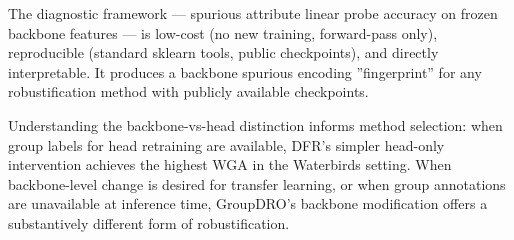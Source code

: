 The diagnostic framework --- spurious attribute linear probe accuracy on frozen backbone features --- is low-cost (no new training, forward-pass only), reproducible (standard sklearn tools, public checkpoints), and directly interpretable. It produces a backbone spurious encoding ''fingerprint'' for any robustification method with publicly available checkpoints.

Understanding the backbone-vs-head distinction informs method selection: when group labels for head retraining are available, DFR's simpler head-only intervention achieves the highest WGA in the Waterbirds setting. When backbone-level change is desired for transfer learning, or when group annotations are unavailable at inference time, GroupDRO's backbone modification offers a substantively different form of robustification.

